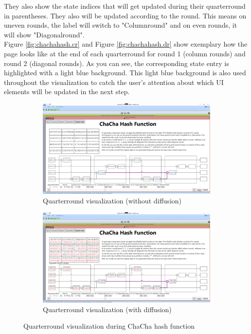 They also show the state indices that will get updated during their quarterround in parentheses. They also will be updated according to the round. This means on uneven rounds, the label will switch to "Columnround" and on even rounds, it will show "Diagonalround". \\
Figure \ref{fig:chachahash.cr} and Figure \ref{fig:chachahash.dr} show exemplary how the page looks like at the end of each quarterround for round 1 (column rounds) and round 2 (diagonal rounds). As you can see, the corresponding state entry is highlighted with a light blue background. This light blue background is also used throughout the visualization to catch the user's attention about which UI elements will be updated in the next step.\\

\begin{figure}
\centering
\begin{subfigure}{\textwidth}
  \centering
  \includegraphics[width=\textwidth]{figures/ct2/chachahash/chachahash-mid-qr.png}
  \caption{Quarterround visualization (without diffusion)}
  \label{fig:chachahash.mid.qr.without.diffusion}
\end{subfigure}
\begin{subfigure}{\textwidth}
  \centering
  \includegraphics[width=\textwidth]{figures/ct2/chachahash/chachahash-mid-qr-diffusion.png}
  \caption{Quarterround visualization (with diffusion)}
  \label{fig:chachahash.mid.qr.with.diffusion}
\end{subfigure}
\caption[Quarterround visualization]{Quarterround visualization during ChaCha hash function}
\label{fig:chachahash.mid.qr}
\end{figure}

